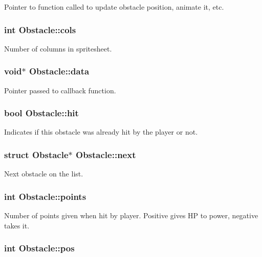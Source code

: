 Pointer to function called to update obstacle position, animate it, etc. \hypertarget{structObstacle_ad51aa07361c732a47e78c80fae2fab7c}{
\subsubsection[{cols}]{\setlength{\rightskip}{0pt plus 5cm}int Obstacle\+::cols}}\label{structObstacle_ad51aa07361c732a47e78c80fae2fab7c}
Number of columns in spritesheet. \hypertarget{structObstacle_a88728e624cc62993e2bf52aff816cdff}{
\subsubsection[{data}]{\setlength{\rightskip}{0pt plus 5cm}void$\ast$ Obstacle\+::data}}\label{structObstacle_a88728e624cc62993e2bf52aff816cdff}
Pointer passed to callback function. \hypertarget{structObstacle_ac89d025f4ad7c2f083d262c1bee4e851}{
\subsubsection[{hit}]{\setlength{\rightskip}{0pt plus 5cm}bool Obstacle\+::hit}}\label{structObstacle_ac89d025f4ad7c2f083d262c1bee4e851}
Indicates if this obstacle was already hit by the player or not. \hypertarget{structObstacle_aedbcf65351fa59ca9f18f6fba0287dc1}{
\subsubsection[{next}]{\setlength{\rightskip}{0pt plus 5cm}struct {\bf Obstacle}$\ast$ Obstacle\+::next}}\label{structObstacle_aedbcf65351fa59ca9f18f6fba0287dc1}
Next obstacle on the list. \hypertarget{structObstacle_a38a164a0e4d6f6508fb65c6eff39147f}{
\subsubsection[{points}]{\setlength{\rightskip}{0pt plus 5cm}int Obstacle\+::points}}\label{structObstacle_a38a164a0e4d6f6508fb65c6eff39147f}
Number of points given when hit by player. Positive gives H\+P to power, negative takes it. \hypertarget{structObstacle_a5228dff4dc773a66043e822fb4d6d00c}{
\subsubsection[{pos}]{\setlength{\rightskip}{0pt plus 5cm}int Obstacle\+::pos}}\label{structObstacle_a5228dff4dc773a66043e822fb4d6d00c}
